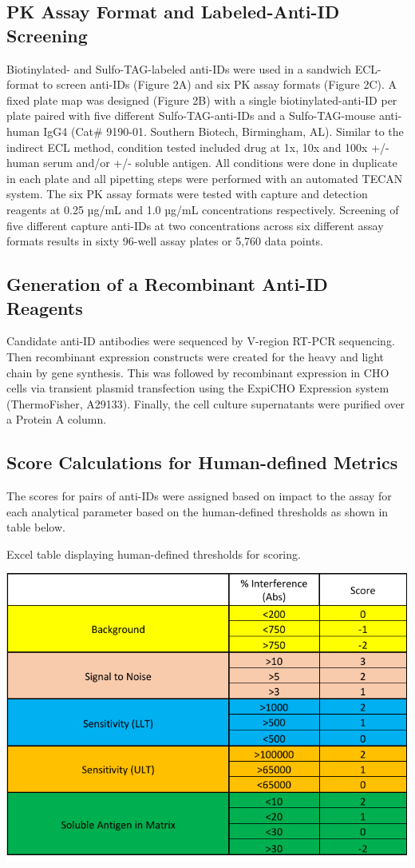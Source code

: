 \subsection{PK Assay Format and Labeled-Anti-ID Screening}
Biotinylated- and Sulfo-TAG-labeled anti-IDs were used in a sandwich ECL-format to screen anti-IDs (Figure 2A) and six PK assay formats (Figure 2C).  A fixed plate map was designed (Figure 2B) with a single biotinylated-anti-ID per plate paired with five different Sulfo-TAG-anti-IDs and a Sulfo-TAG-mouse anti-human IgG4 (Cat# 9190-01. Southern Biotech, Birmingham, AL).   Similar to the indirect ECL method, condition tested included drug at 1x, 10x and 100x +/- human serum and/or +/- soluble antigen. All conditions were done in duplicate in each plate and all pipetting steps were performed with an automated TECAN system.  The six PK assay formats were tested with capture and detection reagents at 0.25 µg/mL and 1.0 µg/mL concentrations respectively.  Screening of five different capture anti-IDs at two concentrations across six different assay formats results in sixty 96-well assay plates or 5,760 data points.
\subsection{Generation of a Recombinant Anti-ID Reagents}
Candidate anti-ID antibodies were sequenced by V-region RT-PCR sequencing.  Then recombinant expression constructs were created for the heavy and light chain by gene synthesis.   This was followed by recombinant expression in CHO cells via transient plasmid transfection using the ExpiCHO Expression system (ThermoFisher, A29133).  Finally, the cell culture supernatants were purified over a Protein A column.
\subsection{Score Calculations for Human-defined Metrics}
The scores for pairs of anti-IDs were assigned based on impact to the assay for each analytical parameter based on the human-defined thresholds as shown in table below.

\begin{table}[ht]
 \centering
 \caption{Excel table displaying human-defined thresholds for scoring.}
 \includegraphics{graphics/ch3/Table_1.pdf}
\end{table} 
 
